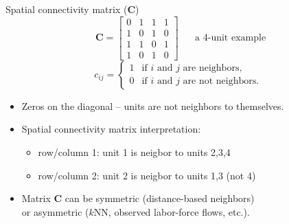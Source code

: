 \documentclass{beamer}
\begin{document}
\begin{frame}{Spatial connectivity matrix ($\bm{C}$)}
$$
~~\bm{C} = \begin{bmatrix}
0 & 1 & 1 & 1 \\
1 & 0 & 1 & 0 \\
1 & 1 & 0 & 1 \\
1 & 0 & 1 & 0
\end{bmatrix}\quad \text{~~a 4-unit example}$$
$$c_{ij}=
	\begin{cases}
	1 & \text{if $i$ and $j$ are neighbors,}\\
	0 & \text{if $i$ and $j$ are not neighbors.}
	\end{cases}$$
\begin{itemize}
	\item Zeros on the diagonal -- units are not neighbors to themselves.
	\smallskip
	\item Spatial connectivity matrix interpretation: 
	\smallskip
	\begin{itemize}
		\item row/column 1: unit 1 is neigbor to units 2,3,4
		\item row/column 2: unit 2 is neigbor to units 1,3 (not 4)
	\end{itemize}
	\smallskip
    \item Matrix $\bm{C}$ can be symmetric (distance-based neighbors)\\
    or asymmetric ($k$NN, observed labor-force flows, etc.).
\end{itemize}
\end{frame}
\end{document}
